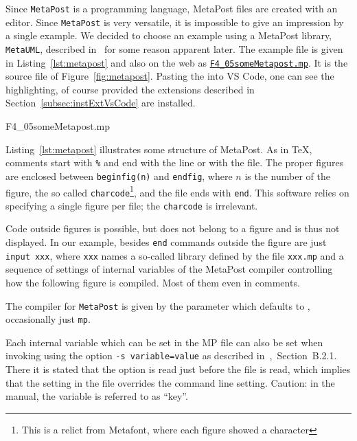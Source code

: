 Since \texttt{MetaPost} is a programming language, 
MetaPost files are created with an editor. 
Since \texttt{MetaPost} is very versatile, 
it is impossible to give an impression by a single example. 
We decided to choose an example 
using a MetaPost library, \texttt{MetaUML}, 
described in~\cite{MetaUml} for some reason apparent later. 
The example file is given in Listing~\ref{lst:metapost} 
and also on the web as 
\href{\urlSite fromTex/F4_05someMetapost.mp}{\texttt{F4\_05someMetapost.mp}}. 
It is the source file of Figure~\ref{fig:metapost}. 
Pasting the into VS Code, one can see the highlighting, 
of course provided the extensions 
described in Section~\ref{subsec:instExtVsCode} are installed. 



{F4_05someMetapost.mp}

Listing~\ref{lst:metapost} illustrates some structure of MetaPost. 
As in \TeX, comments start with \texttt{\%} and end with the line or with the file. 
The proper figures are enclosed between \texttt{beginfig(n)} and \texttt{endfig}, %
where $n$ is the number of the figure, the so called \texttt{charcode}\footnote%
{This is a relict from Metafont, where each figure showed a character}, 
and the file ends with \texttt{end}. 
This software relies on specifying a single figure per file; the \texttt{charcode} is irrelevant. 

Code outside figures is possible, but does not belong to a figure 
and is thus not displayed. 
In our example, besides \texttt{end} commands outside the figure 
are just \texttt{input xxx}, where \texttt{xxx} names a so-called library 
defined by the file \texttt{xxx.mp} 
and a sequence of settings of internal variables 
of the MetaPost compiler 
controlling how the following figure is compiled. 
Most of them even in comments. 

The compiler for \texttt{MetaPost} 
is given by the parameter  
which defaults to , occasionally just \texttt{mp}. 

Each internal variable which can be set in the MP file 
can also be set when invoking  
using the option \texttt{-s \textlangle{}variable\textrangle=\textlangle{}value\textrangle} 
as described in~\cite{MPost24},~Section~B.2.1. 
There it is stated that the option is read just before the file is read, 
which implies that the setting in the file overrides the command line setting. 
Caution: in the manual, the variable is referred to as ``key''. 

